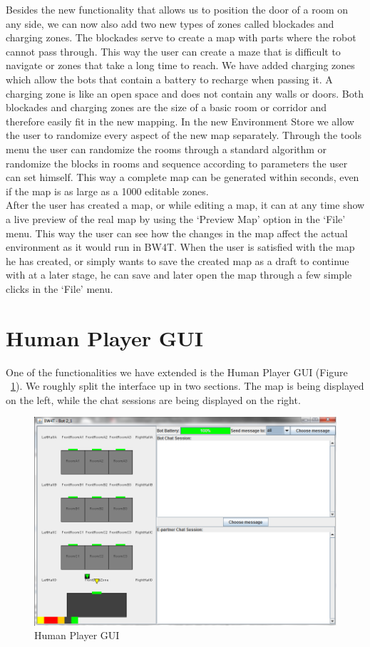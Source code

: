 Besides the new functionality that allows us to position the door of a room on any side, we can now also add two new types of zones called blockades and charging zones. The blockades serve to create a map with parts where the robot cannot pass through. This way the user can create a maze that is difficult to navigate or zones that take a long time to reach. We have added charging zones which allow the bots that contain a battery to recharge when passing it. A charging zone is like an open space and does not contain any walls or doors. Both blockades and charging zones are the size of a basic room or corridor and therefore easily fit in the new mapping.
In the new Environment Store we allow the user to randomize every aspect of the new map separately. Through the tools menu the user can randomize the rooms through a standard algorithm or randomize the blocks in rooms and sequence according to parameters the user can set himself. This way a complete map can be generated within seconds, even if the map is as large as a 1000 editable zones. \\

After the user has created a map, or while editing a map, it can at any time show a live preview of the real map by using the `Preview Map' option in the `File' menu. This way the user can see how the changes in the map affect the actual environment as it would run in BW4T. When the user is satisfied with the map he has created, or simply wants to save the created map as a draft to continue with at a later stage, he can save and later open the map through a few simple clicks in the `File' menu.

\section{Human Player GUI}
One of the functionalities we have extended is the Human Player GUI (Figure ~\ref{fig:hpg}). We roughly split the interface up in two sections. The map is being displayed on the left, while the chat sessions are being displayed on the right.

\begin{figure}
\includegraphics[width=\textwidth]{pictures/hpg.png}
\caption{Human Player GUI}
\label{fig:hpg}
\end{figure}

